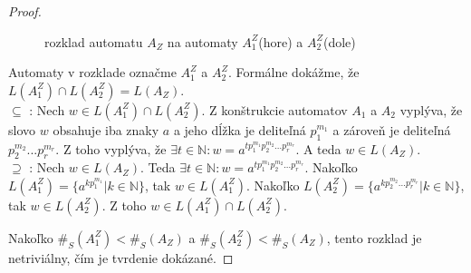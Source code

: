 \begin{proof}
\begin{figure}[H]
\centering
{}
\caption{rozklad automatu $ A_Z $ na automaty $ A_1^Z $(hore) a $ A_2^Z $(dole)} \label{fig:dec_An}
\end{figure}

Automaty v rozklade označme $ A_1^Z $ a $ A_2^Z $. Formálne dokážme, že $ L(A_1^Z) \cap L(A_2^Z) = L(A_Z) $. \\
$ \subseteq $ : Nech $ w \in L(A_1^Z) \cap L(A_2^Z)$. Z konštrukcie automatov $ A_1 $ a $ A_2 $ vyplýva, že slovo $ w $ obsahuje iba znaky $ a $ a jeho dĺžka je deliteľná $ p_{1}^{m_1} $ a zároveň je deliteľná $p_{2}^{m_2}...p_{r}^{m_r} $. Z toho vyplýva, že $ \exists t \in \mathbb{N}: w = a^{tp_{1}^{m_1}p_{2}^{m_2}...p_{r}^{m_r}} $. A teda $ w \in L(A_Z) $. \\
$ \supseteq $ : Nech $ w \in L(A_Z)$. Teda $ \exists t \in \mathbb{N}: w = a^{tp_{1}^{m_1}p_{2}^{m_2}...p_{r}^{m_r}} $. Nakoľko $ L(A_1^Z) = \lbrace a^{kp_{1}^{m_1}} | k \in \mathbb{N} \rbrace $, tak $ w \in L(A_1^Z) $. Nakoľko $ L(A_2^Z) = \lbrace a^{kp_{2}^{m_2}...p_{r}^{m_r}} | k \in \mathbb{N} \rbrace $, tak $ w \in L(A_2^Z) $. Z toho $ w \in L(A_1^Z) \cap L(A_2^Z)$.
\par
Nakoľko $ \#_{S}(A_1^Z) < \#_{S}(A_Z) $ a $ \#_{S}(A_2^Z) < \#_{S}(A_Z) $, tento rozklad je netriviálny, čím je tvrdenie dokázané.

\end{proof}

